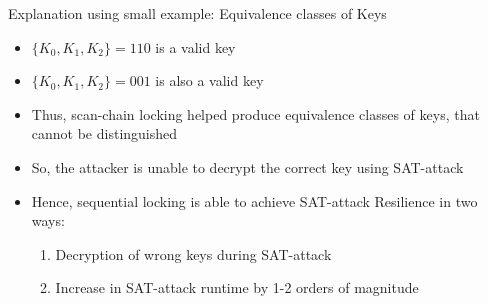 \begin{frame}{Explanation using small example: Equivalence classes of Keys}
\begin{itemize}
\item $\{K_0, K_1, K_2\}=110$ is a valid key
\item $\{K_0, K_1, K_2\}=001$ is also a valid key
\item Thus, scan-chain locking helped produce equivalence classes of keys, that cannot be distinguished
\item So, the attacker is unable to decrypt the correct key using SAT-attack
\item Hence, sequential locking is able to achieve SAT-attack Resilience in two ways:
	\begin{enumerate}
		\item Decryption of wrong keys during SAT-attack
		\item Increase in SAT-attack runtime by 1-2 orders of magnitude
	\end{enumerate}
\end{itemize}
\end{frame}
